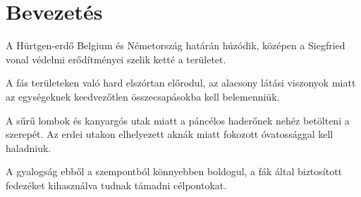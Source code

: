 \chapter{Bevezetés}
A Hürtgen-erdő Belgium és Németország határán húzódik, középen a Siegfried vonal védelmi erődítményei szelik ketté a területet.

A fás területeken való hard elszórtan előrodul, az alacsony látási viszonyok miatt az egységeknek keedvezőtlen összecsapásokba kell belemenniük.

A sűrű lombok és kanyargós utak miatt a páncélos haderőnek nehéz betölteni a szerepét. Az erdei utakon elhelyezett aknák miatt fokozott óvatossággal kell haladniuk.

A gyalogság ebből a szempontból könnyebben boldogul, a fák által biztosított fedezéket kihasználva tudnak támadni célpontokat.